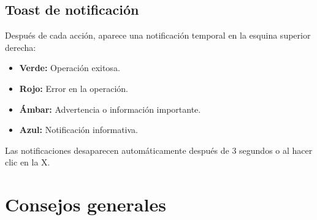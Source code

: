 \documentclass[12pt]{article}
\begin{document}
\subsection{Toast de notificación}
Después de cada acción, aparece una notificación temporal en la esquina superior derecha:

\begin{itemize}[nosep]
  \item \textbf{Verde:} Operación exitosa.
  \item \textbf{Rojo:} Error en la operación.
  \item \textbf{Ámbar:} Advertencia o información importante.
  \item \textbf{Azul:} Notificación informativa.
\end{itemize}

Las notificaciones desaparecen automáticamente después de 3 segundos o al hacer clic en la X.

\section{Consejos generales}
\label{sec:consejos}
\end{document}
